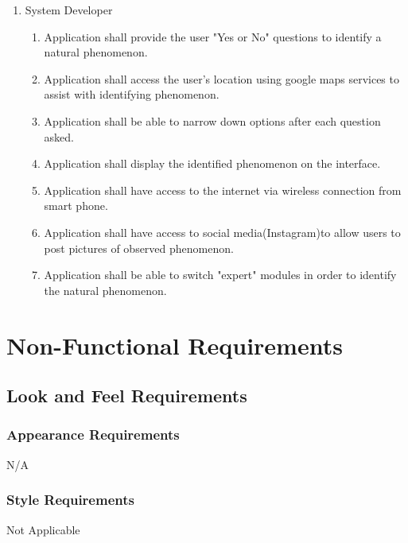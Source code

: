 \documentclass[]{article}
\begin{document}
\begin{enumerate}[{BE}1.]
\begin{enumerate}[{VP4}.1]
\begin{enumerate}
			\end{enumerate}
		\item System Developer
			\begin{enumerate}
				\item Application shall provide the user "Yes or No" questions to identify a natural phenomenon.
				\item Application shall access the user's location using google maps services to assist with identifying phenomenon.
				\item Application shall be able to narrow down options after each question asked. 
				\item Application shall display the identified phenomenon on the interface.
				\item Application shall have access to the internet via wireless connection from smart phone.
				\item Application shall have access to social media(Instagram)to allow users to post pictures of observed phenomenon. 
				\item Application shall be able to switch "expert" modules in order to identify the natural phenomenon.
				
			\end{enumerate}
	\end{enumerate}
\end{enumerate}


\section{Non-Functional Requirements}
\label{sec:non-functional_requirements}
\subsection{Look and Feel Requirements}
\label{sub:look_and_feel_requirements}

\subsubsection{Appearance Requirements}
\label{ssub:appearance_requirements}
\begin{itemize}
	N/A
\end{itemize}

\subsubsection{Style Requirements}
\label{ssub:style_requirements}
	 Not Applicable
\end{document}
